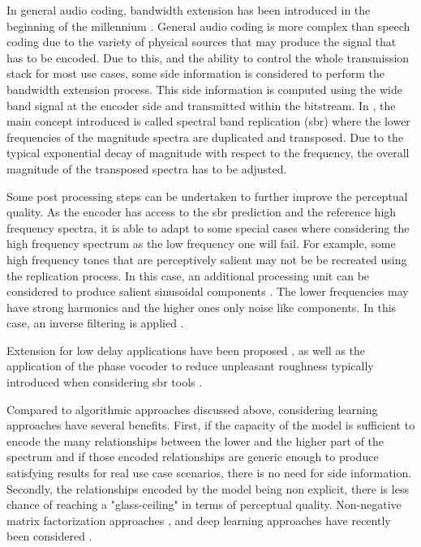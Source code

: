 \documentclass{article}
\begin{document}
In general audio coding, bandwidth extension has been introduced in the beginning of the millennium \cite{dietz2002spectral}. General audio coding is more complex than speech coding due to the variety of physical sources that may produce the signal that has to be encoded. Due to this, and the ability to control the whole transmission stack for most use cases, some side information is considered to perform the bandwidth extension process. This side information is computed using the wide band signal at the encoder side and transmitted within the bitstream. In \cite{dietz2002spectral}, the main concept introduced is called spectral band replication (sbr) where the lower frequencies of the magnitude spectra are duplicated and transposed. Due to the typical exponential decay of magnitude with respect to the frequency, the overall magnitude of the transposed spectra has to be adjusted.

Some post processing steps can be undertaken to further improve the perceptual quality. As the encoder has access to the sbr prediction and the reference high frequency spectra, it is able to adapt to some special cases where considering the high frequency spectrum as the low frequency one will fail. For example,  some high frequency tones that are perceptively salient may not be be recreated using the replication process. In this case, an additional processing unit can be considered to produce salient sinusoidal components \cite{ekstrand2002bandwidth}. The lower frequencies may have strong harmonics and the higher ones only noise like components. In this case, an inverse filtering is applied \cite{ehret2004audio}.

Extension for low delay applications have been proposed \cite{friedrich2007spectral}, as well as the application of the phase vocoder \cite{flanagan1966phase} to reduce unpleasant roughness typically introduced when considering sbr tools \cite{nagel2009harmonic}.

Compared to algorithmic approaches discussed above, considering learning approaches have several benefits. First, if the capacity of the model is sufficient to encode the many relationships between the lower and the higher part of the spectrum and if those encoded relationships are generic enough to produce satisfying results for real use case scenarios, there is no need for side information. Secondly, the relationships encoded by the model being non explicit, there is less chance of reaching a "glass-ceiling" in terms of perceptual quality. Non-negative matrix factorization approaches \cite{sun2013non},  and deep learning approaches have recently been considered \cite{miron2018high}.
\end{document}
